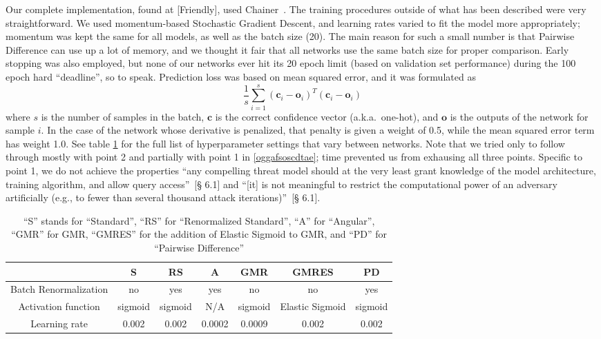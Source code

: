 Our complete implementation, found at \cite{mycode}[Friendly], used Chainer~\cite{tokui2019chainer,
language, 2020NumPy-Array, cupy_learningsys2017}. The training procedures outside of what has been
described were very straightforward. We used momentum-based Stochastic Gradient Descent, and
learning rates varied to fit the model more appropriately; momentum was kept the same for all
models, as well as the batch size (20). The main reason for such a small number is that Pairwise
Difference can use up a lot of memory, and we thought it fair that all networks use the same batch
size for proper comparison. Early stopping was also employed, but none of our networks ever hit its
20 epoch limit (based on validation set performance) during the 100 epoch hard ``deadline'', so to
speak. Prediction loss was based on mean squared error, and it was formulated as
\[
    \frac{1}{s} \sum_{i=1}^{s} (\mathbf{c}_i - \mathbf{o}_i)^T (\mathbf{c}_i - \mathbf{o}_i)
\]
where $s$ is the number of samples in the batch, $\mathbf{c}$ is the correct confidence vector
(a.k.a.\ one-hot), and $\mathbf{o}$ is the outputs of the network for sample $i$. In the case of the
network whose derivative is penalized, that penalty is given a weight of 0.5, while the mean squared
error term has weight 1.0. See table \ref{settings} for the full list of hyperparameter settings
that vary between networks. Note that we tried only to follow through mostly with point 2 and
partially with point 1 in \ref{oggafsoscdtae}; time prevented us from exhausing all three points.
Specific to point 1, we do not achieve the properties ``any compelling threat model should at the
very least grant knowledge of the model architecture, training algorithm, and allow query
access''~\cite{athalye2018obfuscated}[§ 6.1] and ``[it] is not meaningful to restrict the
computational power of an adversary artificially (e.g., to fewer than several thousand attack
iterations)''~\cite{athalye2018obfuscated}[§ 6.1].
\begin{table}[th]
    \begin{center}
        \begin{tabular}{| c | c | c | c | c | c | c |}
            \hline
                                  &     S       &     RS      &   A     &     GMR     &      GMRES        &   PD     \\
            \hline
            Batch Renormalization &     no      &     yes     &   yes   &     no      &        no         &  yes     \\
            Activation function   &   sigmoid   &   sigmoid   &   N/A   &   sigmoid   &  Elastic Sigmoid  & sigmoid  \\
            Learning rate         &    0.002    &    0.002    & 0.0002  &    0.0009   &      0.002        &  0.002   \\
            \hline
        \end{tabular}
    \end{center}
    \caption{``S'' stands for ``Standard'', ``RS'' for ``Renormalized Standard'', ``A'' for
             ``Angular'', ``GMR'' for GMR, ``GMRES'' for the addition of Elastic Sigmoid to GMR, and
             ``PD'' for ``Pairwise Difference''}
    \label{settings}
\end{table}
